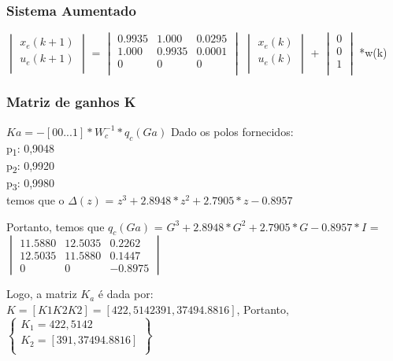 \documentclass[a4paper,12pt]{article}
\begin{document}
\subsubsection{Sistema Aumentado}
$
\begin{vmatrix}
x_{e}(k+1)\\ 
u_{e}(k+1) \\
\end{vmatrix}
$
=
$
\begin{vmatrix}
0.9935 & 1.000 & 0.0295\\
1.000 & 0.9935 & 0.0001\\
0 & 0 & 0 \\
\end{vmatrix}
$
$
\begin{vmatrix}
x_e(k)\\
u_e(k)\\
\end{vmatrix}
$
+
$
\begin{vmatrix}
0\\ 
0\\
1\\
\end{vmatrix}
$
*w(k)
\subsubsection{Matriz de ganhos K}
$Ka = - \left [0 0 ... 1  \right ]*W_c^{-1}*q_c(Ga)$
Dado os polos fornecidos:\\
p\textsubscript{1}: 0,9048\\
p\textsubscript{2}: 0,9920\\
p\textsubscript{3}: 0,9980\\

temos que o $\Delta(z)$ = $z^3+2.8948*z^2+2.7905*z-0.8957$

Portanto, temos que $q_c(Ga)$ = $G^3+2.8948*G^2+2.7905*G-0.8957*I$ = 
$
\begin{vmatrix}
11.5880 & 12.5035 & 0.2262\\ 
12.5035 & 11.5880 & 0.1447\\ 
0 & 0 & -0.8975
\end{vmatrix}
$

Logo, a matriz $K_a$ \'{e} dada por:\\
$K = \left [K1 K2 K2  \right ] = \left [ 422,5142 391,3749 4.8816 \right ]$, Portanto,\\
$
\begin{Bmatrix}
K_1 = 422,5142\\
K_2 = \left [ 391,3749 4.8816 \right ]\\
\end{Bmatrix}
$
\end{document}
